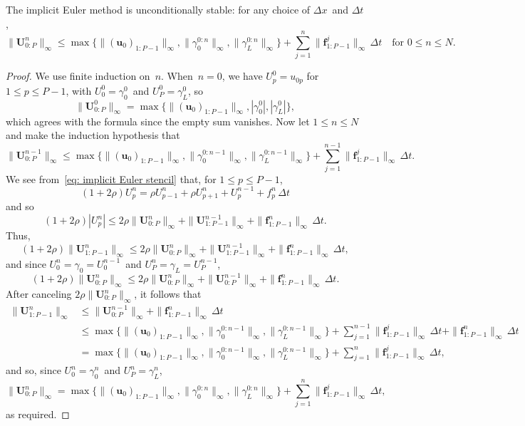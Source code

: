 \begin{theorem}
The implicit Euler method is unconditionally stable: for any choice of 
$\Delta x$~and $\Delta t$,
\[
\|\boldsymbol{U}^n_{0:P}\|_\infty
	\le\max\bigl\{\|(\boldsymbol{u}_0)_{1:P-1}\|_\infty, 
		\|\gamma_0^{0:n}\|_\infty,\|\gamma_L^{0:n}\|_\infty\bigr\}
	+\sum_{j=1}^n\|\boldsymbol{f}^j_{1:P-1}\|_\infty\,\Delta t
\quad\text{for $0\le n\le N$.}
\]
\end{theorem}
\begin{proof}
We use finite induction on~$n$.  When~$n=0$, we have
$U^0_p=u_{0p}$ for~$1\le p\le P-1$, with $U^0_0=\gamma_0^0$~and 
$U^0_P=\gamma_L^0$,
so 
\[
\|\boldsymbol{U}^0_{0:P}\|_\infty=
\max\bigl\{\|(\boldsymbol{u}_0)_{1:P-1}\|_\infty,
	|\gamma_0^0|,|\gamma_L^0|\bigr\},
\]
which agrees with the formula since the empty sum vanishes. Now let 
$1\le n\le N$ and make the induction hypothesis that
\[
\|\boldsymbol{U}^{n-1}_{0:P}\|_\infty
	\le\max\bigl\{\|(\boldsymbol{u}_0)_{1:P-1}\|_\infty, 
		\|\gamma_0^{0:n-1}\|_\infty,\|\gamma_L^{0:n-1}\|_\infty\bigr\}
	+\sum_{j=1}^{n-1}\|\boldsymbol{f}^j_{1:P-1}\|_\infty\,\Delta t.
\]
We see from~\eqref{eq: implicit Euler stencil} that, for $1\le p\le P-1$,
\[
(1+2\rho)U^n_p=\rho U^n_{p-1}+\rho U^n_{p+1}+U^{n-1}_p+f^n_p\,\Delta t
\]
and so
\[
(1+2\rho)|U^n_p|\le2\rho\|\boldsymbol{U}^n_{0:P}\|_\infty
	+\|\boldsymbol{U}^{n-1}_{1:P-1}\|_\infty
	+\|\boldsymbol{f}^n_{1:P-1}\|_\infty\,\Delta t.
\]
Thus,
\[
(1+2\rho)\|\boldsymbol{U}^n_{1:P-1}\|_\infty
	\le2\rho\|\boldsymbol{U}^n_{0:P}\|_\infty
	+\|\boldsymbol{U}^{n-1}_{1:P-1}\|_\infty
	+\|\boldsymbol{f}^n_{1:P-1}\|_\infty\,\Delta t,
\]
and since $U^n_0=\gamma_0=U^{n-1}_0$~and $U^n_P=\gamma_L=U^{n-1}_P$, 
\[
(1+2\rho)\|\boldsymbol{U}^n_{0:P}\|_\infty
	\le2\rho\|\boldsymbol{U}^n_{0:P}\|_\infty
	+\|\boldsymbol{U}^{n-1}_{0:P}\|_\infty
	+\|\boldsymbol{f}^n_{1:P-1}\|_\infty\,\Delta t.
\]
After canceling $2\rho\|\boldsymbol{U}^n_{0:P}\|_\infty$, it follows that
\begin{align*}
\|\boldsymbol{U}^n_{1:P-1}\|_\infty&\le\|\boldsymbol{U}^{n-1}_{0:P}\|_\infty
	+\|\boldsymbol{f}^n_{1:P-1}\|_\infty\,\Delta t\\
	&\le\max\bigl\{\|(\boldsymbol{u}_0)_{1:P-1}\|_\infty,
	\|\gamma_0^{0:n-1}\|_\infty,\|\gamma_L^{0:n-1}\|_\infty\bigr\}
	+\sum_{j=1}^{n-1}\|\boldsymbol{f}^j_{1:P-1}\|_\infty\,\Delta t
	+\|\boldsymbol{f}^n_{1:P-1}\|_\infty\,\Delta t\\
	&=\max\bigl\{\|(\boldsymbol{u}_0)_{1:P-1}\|_\infty,
	\|\gamma_0^{0:n-1}\|_\infty,\|\gamma_L^{0:n-1}\|_\infty\bigr\}
	+\sum_{j=1}^n\|\boldsymbol{f}^j_{1:P-1}\|_\infty\,\Delta t,
\end{align*}
and so, since $U^n_0=\gamma_0^n$~and $U^n_P=\gamma_L^n$,
\[
\|\boldsymbol{U}^n_{0:P}\|_\infty
	=\max\bigl\{\|(\boldsymbol{u}_0)_{1:P-1}\|_\infty,
	\|\gamma_0^{0:n}\|_\infty,\|\gamma_L^{0:n}\|_\infty\bigr\}
	+\sum_{j=1}^n\|\boldsymbol{f}^j_{1:P-1}\|_\infty\,\Delta t,
\]
as required.
\end{proof}

